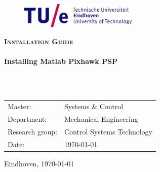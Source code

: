 
\begin{titlepage}

\begin{center}

\begin{figure}[h!]
    \parbox [t]{\textwidth}
        {
        \center
        \includegraphics[width=0.5\textwidth]{fig_general/TUe.png}
        }
\end{figure}

\vspace{10 mm}

\textsc{\huge {\bf Installation Guide}}\\[0.9cm]

\HRule \\[0.4cm]

{ \huge \bfseries Installing Matlab Pixhawk PSP}\\[0.4cm]

\HRule \\[0.4cm]

\vspace{20 mm}

\textsl{\Large  }\\[0.9cm]
\vspace{30 mm}




	
	\vspace{20 mm}
	
    \begin{tabular}{ l l }
    	Master: & Systems \& Control \\
    	Department: & Mechanical Engineering \\
    	Research group: & Control Systems Technology\\
    	Date: & \today\\
    \end{tabular}


\vfill

{\large Eindhoven, \today} \\
\end{center}
\end{titlepage}
\afterpage{\blankpage}